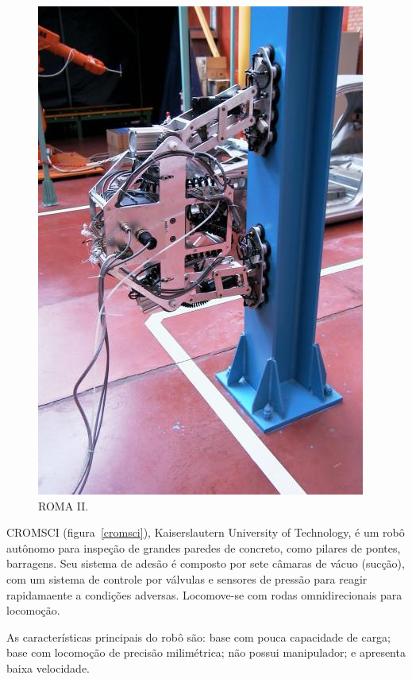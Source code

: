 \begin{figure}[ht]
\centering
\includegraphics[width=\columnwidth]{sota/figs/climbers/roma2.jpg}
\caption{ROMA II.}
\label{roma2}
\end{figure}

CROMSCI (figura~\ref{cromsci}), Kaiserslautern University of Technology, é um
robô autônomo para inspeção de grandes paredes de concreto, como pilares de pontes, barragens. Seu
sistema de adesão é composto por sete câmaras de vácuo (sucção), com um sistema
de controle por válvulas e sensores de pressão para reagir rapidamaente a
condições adversas. Locomove-se com rodas omnidirecionais para locomoção.

As características principais do robô são: base com pouca capacidade de
carga; base com locomoção de precisão milimétrica; não possui manipulador; e
apresenta baixa velocidade.

